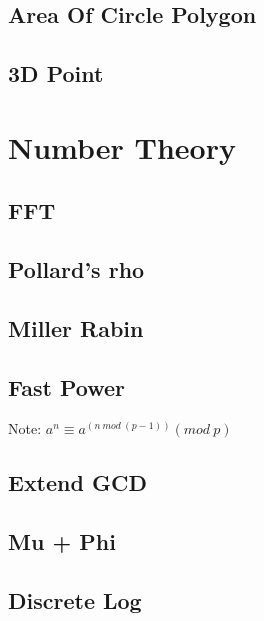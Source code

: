 \documentclass[a4paper,10pt,twocolumn,oneside,x11names]{article}
\begin{document}
\subsection{Area Of Circle Polygon}


\subsection{3D Point}


\section{Number Theory}

\subsection{FFT}


\subsection{Pollard's rho}


\subsection{Miller Rabin}


\subsection{Fast Power}
{ \normalsize
Note: $a^n \equiv a^{(n \ mod \ (p-1))} (mod \ p)$
}

\subsection{Extend GCD}


\subsection{Mu + Phi}


\subsection{Discrete Log}

\end{document}
